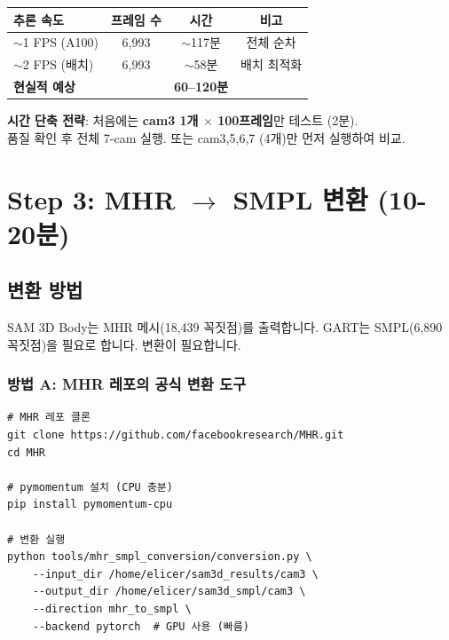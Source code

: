 \documentclass[11pt, a4paper]{report}
\begin{document}
\begin{center}
\renewcommand{\arraystretch}{1.2}
\begin{tabular}{lccc}
\toprule
\textbf{추론 속도} & \textbf{프레임 수} & \textbf{시간} & \textbf{비고} \\
\midrule
$\sim$1 FPS (A100) & 6,993 & $\sim$117분 & 전체 순차 \\
$\sim$2 FPS (배치) & 6,993 & $\sim$58분 & 배치 최적화 \\
\midrule
\textbf{현실적 예상} & & \textbf{60--120분} & \\
\bottomrule
\end{tabular}
\end{center}

\begin{importantnote}
\textbf{시간 단축 전략}: 처음에는 \textbf{cam3 1개 $\times$ 100프레임}만 테스트 (2분).\\
품질 확인 후 전체 7-cam 실행. 또는 cam3,5,6,7 (4개)만 먼저 실행하여 비교.
\end{importantnote}


\chapter{Step 3: MHR $\to$ SMPL 변환 (10-20분)}

\section{변환 방법}

SAM 3D Body는 MHR 메시(18,439 꼭짓점)를 출력합니다. GART는 SMPL(6,890 꼭짓점)을 필요로 합니다. 변환이 필요합니다.

\subsection{방법 A: MHR 레포의 공식 변환 도구}

\begin{codebox}[title={MHR $\to$ SMPL 변환}]
\begin{verbatim}
# MHR 레포 클론
git clone https://github.com/facebookresearch/MHR.git
cd MHR

# pymomentum 설치 (CPU 충분)
pip install pymomentum-cpu

# 변환 실행
python tools/mhr_smpl_conversion/conversion.py \
    --input_dir /home/elicer/sam3d_results/cam3 \
    --output_dir /home/elicer/sam3d_smpl/cam3 \
    --direction mhr_to_smpl \
    --backend pytorch  # GPU 사용 (빠름)
\end{verbatim}
\end{codebox}
\end{document}
